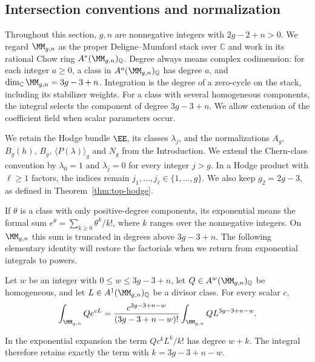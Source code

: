 \subsection{Intersection conventions and normalization}
\label{subsec:s02:01}

Throughout this section, $g,n$ are nonnegative integers with $2g-2+n>0$.
We regard $\MM_{g,n}$ as the proper Deligne--Mumford stack over
$\mathbb C$ and work in its rational Chow ring
$A^*(\MM_{g,n})_{\mathbb Q}$.  Degree always means complex codimension:
for each integer $a\geq0$, a class in
$A^a(\MM_{g,n})_{\mathbb Q}$ has degree $a$, and
$\dim_{\mathbb C}\MM_{g,n}=3g-3+n$.  Integration is the degree of a
zero-cycle on the stack, including its stabilizer weights.  For a class
with several homogeneous components, the integral selects the component
of degree $3g-3+n$.  We allow extension of the coefficient field when
scalar parameters occur.

We retain the Hodge bundle $\EE$, its classes $\lambda_j$, and the
normalizations $A_g$, $B_g(h)$, $B_g$, $\langle P(\lambda)\rangle_g$ and
$N_g$ from the Introduction.  We extend the Chern-class convention by
$\lambda_0=1$ and $\lambda_j=0$ for every integer $j>g$.  In a Hodge
product with $\ell\geq1$ factors, the indices remain
$j_1,\ldots,j_\ell\in\{1,\ldots,g\}$.  We also keep $g_2=2g-3$, as defined in
Theorem~\ref{thm:top-hodge}.

If $\theta$ is a class with only positive-degree components, its
exponential means the formal sum
$e^\theta=\sum_{k\geq0}\theta^k/k!$, where $k$ ranges over the
nonnegative integers.  On $\MM_{g,n}$ this sum is truncated in degrees
above $3g-3+n$.  The following elementary identity will restore the
factorials when we return from exponential integrals to powers.

\begin{lmm}
\label{lmm:s02:exp-to-power}
Let $w$ be an integer with $0\leq w\leq3g-3+n$, let
$Q\in A^w(\MM_{g,n})_{\mathbb Q}$ be homogeneous, and let
$L\in A^1(\MM_{g,n})_{\mathbb Q}$ be a divisor class.  For every scalar
$c$,
\begin{equation}
\label{eq:s02:exp-to-power}
\int_{\MM_{g,n}}Qe^{cL}
=\frac{c^{3g-3+n-w}}{(3g-3+n-w)!}
  \int_{\MM_{g,n}}QL^{3g-3+n-w}.
\end{equation}
\end{lmm}

\begin{prf}
In the exponential expansion the term $Qc^kL^k/k!$ has degree $w+k$.
The integral therefore retains exactly the term with
$k=3g-3+n-w$.
\end{prf}

